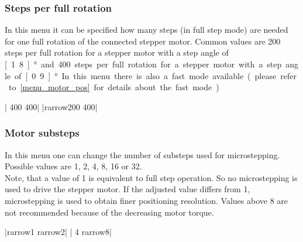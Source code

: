 \subsubsection{Steps per full rotation}
\label{menu_full_rotation}
In this menu it can be specified how many steps (in full step mode) are needed for one full rotation of the connected stepper motor. Common values are 200 steps per full rotation for a stepper motor with a step angle of \unit[1.8]{°} and 400 steps per full rotation for a stepper motor with a step angle of \unit[0.9]{°}. 
In this menu there is also a fast mode available (please refer to  \ref{menu_motor_pos} for details about the fast mode).
\begin{center}
  | 400     400|
             |{rarrow}200     400|
\end{center}


\subsubsection{Motor substeps}
\label{menu_substeps}
In this menu one can change the number of substeps used for microstepping. Possible values are 1, 2, 4, 8, 16 or 32.\\
Note, that a value of 1 is equivalent to full step operation. So no microstepping is used to drive the stepper motor. If the adjusted value differs from 1, microstepping is used to obtain finer positioning resolution. Values above 8 are not recommended because of the decreasing motor torque.
\begin{center}
  |{rarrow}1      {rarrow}2|
             | 4      {rarrow}8|
\end{center}

